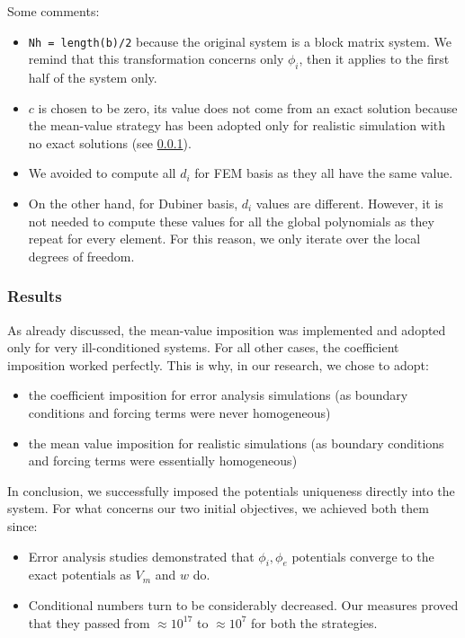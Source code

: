 \documentclass[a4paper,11pt]{article}
\begin{document}
\noindent Some comments:
\begin{itemize}
	\item \texttt{Nh = length(b)/2} because the original system is a block matrix system. We remind that this transformation concerns only $\phi_i$, then it applies to the first half of the system only.
	\item $c$ is chosen to be zero, its value does not come from an exact solution because the mean-value strategy has been adopted only for realistic simulation with no exact solutions (see \ref{uniqueness_results}). 
	\item We avoided to compute all $d_i$ for FEM basis as they all have the same value.
	\item On the other hand, for Dubiner basis, $d_i$ values are different. However, it is not needed to compute these values for all the global polynomials as they repeat for every element. For this reason, we only iterate over the local degrees of freedom.
\end{itemize}
\vspace{6mm}

\subsubsection{Results} \label{uniqueness_results}
\noindent As already discussed, the mean-value imposition was implemented and adopted only for very ill-conditioned systems. For all other cases, the coefficient imposition worked perfectly. This is why, in our research, we chose to adopt:
\begin{itemize}
	\item the coefficient imposition for error analysis simulations (as boundary conditions and forcing terms were never homogeneous)
	\item the mean value imposition for realistic simulations (as boundary conditions and forcing terms were essentially homogeneous)
\end{itemize}\vspace{2mm}

\noindent In conclusion, we successfully imposed the potentials uniqueness directly into the system. For what concerns our two initial objectives, we achieved both them since:
\begin{itemize}
	\item Error analysis studies demonstrated that $\phi_i,\phi_e$ potentials converge to the exact potentials as $V_m$ and $w$ do.
	\item Conditional numbers turn to be considerably decreased. Our measures proved that they passed from $\approx 10^{17}$ to $\approx 10^{7}$ for both the strategies.
\end{itemize} 

    \newpage
    \printbibliography
\end{document}

